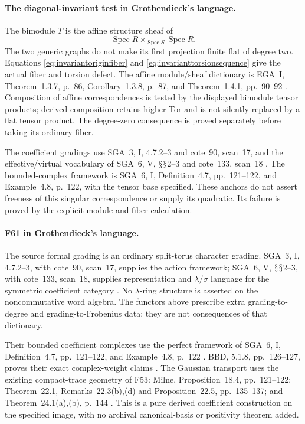 \documentclass[11pt,a4paper]{article}
\renewcommand{\S}{\ensuremath{\mathsection}}
\newcommand{\fid}[1]{\textsf{#1}}\newcommand{\gate}[1]{\textsf{#1}}
\theoremstyle{named}\newtheorem{finding}{Finding}[section]
\theoremstyle{definition}\newtheorem{definition}[finding]{Definition}
\theoremstyle{remark}\newtheorem{remark}[finding]{Remark}
\begin{document}
\paragraph{The diagonal-invariant test in Grothendieck's language.}
The bimodule \(T\) is the affine structure sheaf of
\[
 \operatorname{Spec}R
       \times_{\operatorname{Spec}S}
 \operatorname{Spec}R.
\]
The two generic graphs do not make its first projection
finite flat of degree two. Equations
\eqref{eq:invariantoriginfiber} and
\eqref{eq:invarianttorsionsequence} give the actual fiber
and torsion defect. The affine module/sheaf dictionary is
EGA~I, Theorem~1.3.7, p.~86, Corollary~1.3.8, p.~87, and
Theorem~1.4.1, pp.~90--92 \cite{EGA}.
Composition of affine correspondences is tested by the
displayed bimodule tensor products; derived composition
retains higher Tor and is not silently replaced by a
flat tensor product. The degree-zero consequence is
proved separately before taking its ordinary fiber.

The coefficient gradings use SGA~3, I, 4.7.2--3 and
cote~90, scan~17, and the effective/virtual vocabulary of
SGA~6, V, \S\S2--3 and cote~133, scan~18
\cite{SGA3,SGA6,Archive}. The bounded-complex framework is
SGA~6, I, Definition~4.7, pp.~121--122, and
Example~4.8, p.~122, with the tensor base specified.
These anchors do not assert freeness of this singular
correspondence or supply its quadratic. Its failure is
proved by the explicit module and fiber calculation.

\paragraph{\fid{F61} in Grothendieck's language.}
The source formal grading is an ordinary split-torus
character grading. SGA~3, I, 4.7.2--3, with cote~90,
scan~17, supplies the action framework; SGA~6, V,
\S\S2--3, with cote~133, scan~18, supplies representation
and \(\lambda/\sigma\) language for the symmetric
coefficient category \cite{SGA3,SGA6,Archive}.
No \(\lambda\)-ring structure is asserted on the
noncommutative word algebra.
The functors above prescribe extra grading-to-degree
and grading-to-Frobenius data; they are not consequences
of that dictionary.

Their bounded coefficient complexes use the perfect
framework of SGA~6, I, Definition~4.7, pp.~121--122,
and Example~4.8, p.~122 \cite{SGA6}.
BBD, 5.1.8, pp.~126--127, proves their exact
complex-weight claims \cite{BBD}.
The Gaussian transport uses the existing compact-trace
geometry of \fid{F53}: Milne, Proposition~18.4,
pp.~121--122; Theorem~22.1, Remarks~22.3(b),(d) and
Proposition~22.5, pp.~135--137; and
Theorem~24.1(a),(b), p.~144 \cite{Milne}.
This is a pure derived coefficient construction on the
specified image, with no archival canonical-basis or
positivity theorem added.
\end{document}

